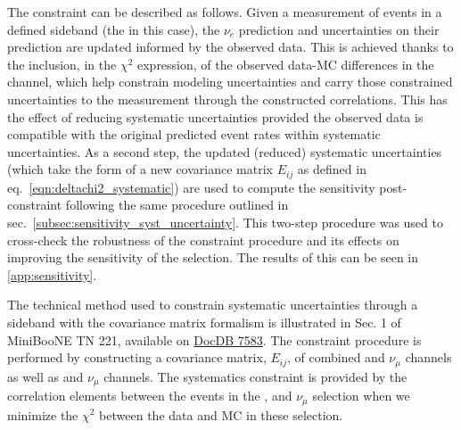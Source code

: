 The constraint can be described as follows. Given a measurement of events in a defined sideband (the \numu in this case), the $\nu_e$ prediction and uncertainties on their prediction are updated informed by the observed data. This is achieved thanks to the inclusion, in the $\chi^2$ expression, of the observed data-MC differences in the \numu channel, which help constrain modeling uncertainties and carry those constrained uncertainties to the \nue measurement through the constructed correlations.
This has the effect of reducing systematic uncertainties provided the observed data is compatible with the original predicted event rates within systematic uncertainties. As a second step, the updated (reduced) systematic uncertainties (which take the form of a new covariance matrix $E_{ij}$ as defined in eq.~\ref{eqn:deltachi2_systematic}) are used to compute the sensitivity post-constraint following the same procedure outlined in sec.~\ref{subsec:sensitivity_syst_uncertainty}. This two-step procedure was used to cross-check the robustness of the constraint procedure and its effects on improving the sensitivity of the \npsel selection. The results of this can be seen in \cref{app:sensitivity}.

The technical method used to constrain systematic uncertainties through a sideband with the covariance matrix formalism is illustrated in Sec. 1 of MiniBooNE TN 221, available on \href{https://microboone-docdb.fnal.gov/cgi-bin/private/RetrieveFile?docid=7583&filename=Constraining\%20the\%20nue\%20Background\%20Uncertainties\%20with\%20the\%20Observed\%20\%20numu\%20\%20Events\%20tn221.pdf&version=1}{DocDB 7583}. The constraint procedure is performed by constructing a covariance matrix, $E_{ij}$, of combined \npsel and $\nu_\mu$ channels as well as \zpsel and $\nu_\mu$ channels. The systematics constraint is provided by the correlation elements between the events in the \npsel, \zpsel and $\nu_\mu$ selection when we minimize the $\chi^2$ between the data and MC in these selection. 

